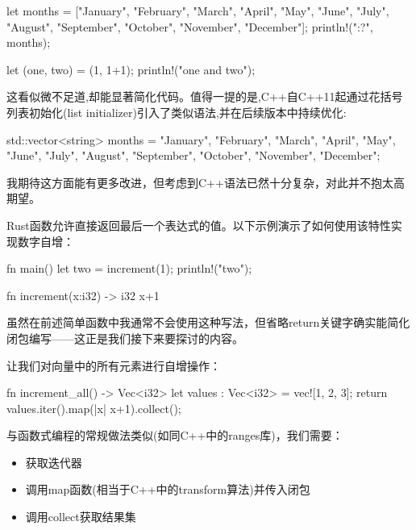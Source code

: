\begin{rust}
let months = ["January", "February", "March", "April", "May", "June", "July", "August", "September", "October", "November", "December"];
println!("{:?}", months);

let (one, two) = (1, 1+1);
println!("{one} and {two}");
\end{rust}

这看似微不足道,却能显著简化代码。值得一提的是,C++自C++11起通过花括号列表初始化(list initializer)引入了类似语法,并在后续版本中持续优化:

\begin{rust}
std::vector<string> months = {"January", "February", "March", "April", "May", "June", "July", "August", "September", "October", "November", "December"};
\end{rust}

我期待这方面能有更多改进，但考虑到C++语法已然十分复杂，对此并不抱太高期望。


Rust函数允许直接返回最后一个表达式的值。以下示例演示了如何使用该特性实现数字自增：

\begin{rust}
fn main() {
  let two = increment(1);
  println!("{two}");
}

fn increment(x:i32) -> i32{
  x+1
}
\end{rust}

虽然在前述简单函数中我通常不会使用这种写法，但省略return关键字确实能简化闭包编写——这正是我们接下来要探讨的内容。



让我们对向量中的所有元素进行自增操作：

\begin{rust}
fn increment_all() -> Vec<i32>{
  let values : Vec<i32> = vec![1, 2, 3];
  return values.iter().map(|x| x+1).collect();
}
\end{rust}

与函数式编程的常规做法类似(如同C++中的ranges库)，我们需要：

\begin{itemize}
\item 
获取迭代器

\item 
调用map函数(相当于C++中的transform算法)并传入闭包

\item 
调用collect获取结果集
\end{itemize}

